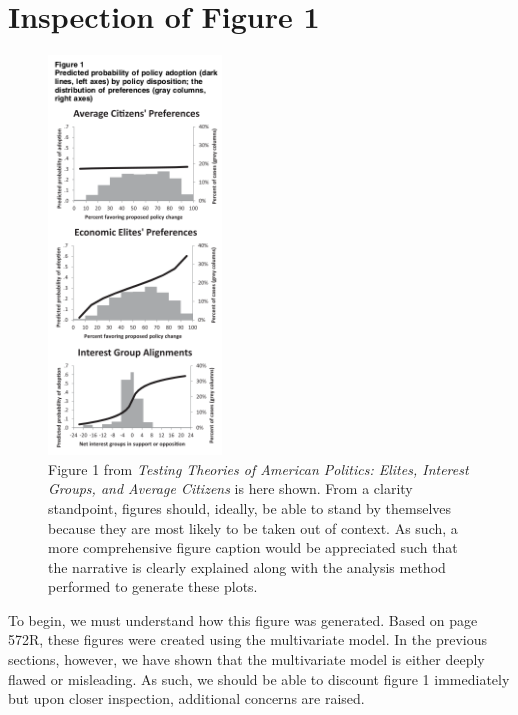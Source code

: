 \documentclass[]{article}
\begin{document}
\section{Inspection of Figure 1}

\begin{figure}[H]
	\begin{center}
		\includegraphics[height=400px]{./figures/figure1.png}
	\end{center}	
	\caption{Figure 1 from \textit{Testing Theories of American Politics: Elites, Interest Groups, and Average Citizens} is here shown. From a clarity standpoint, figures should, ideally, be able to stand by themselves because they are most likely to be taken out of context. As such, a more comprehensive figure caption would be appreciated such that the narrative is clearly explained along with the analysis method performed to generate these plots.}
	\label{paper_figure1}
\end{figure}

To begin, we must understand how this figure was generated.
Based on page 572R, these figures were created using the multivariate model.
In the previous sections, however, we have shown that the multivariate model is either deeply flawed or misleading.
As such, we should be able to discount figure 1 immediately but upon closer inspection, additional concerns are raised.
\end{document}
